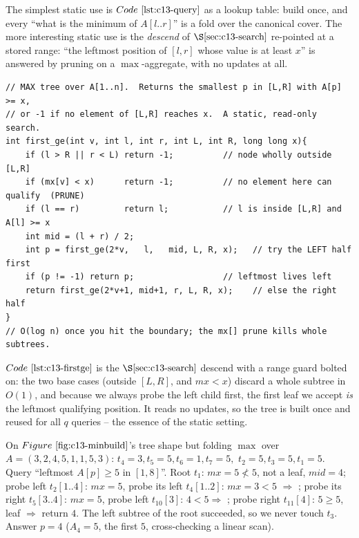 The simplest static use is \(\coderef{c13-query}\) as a lookup table: build once,
and every ``what is the minimum of \(A[l..r]\)'' is a fold over the canonical
cover.  The more interesting static use is the \emph{descend}
of \(\secref{c13-search}\) re-pointed at a stored range: ``the leftmost position
of \([l,r]\) whose value is at least \(x\)'' is answered by pruning on a
\(\max\)-aggregate, with no updates at all.

\begin{lstlisting}[caption={leftmost position in a closed range whose stored max clears a threshold -- a static descend}, label={lst:c13-firstge}]
// MAX tree over A[1..n].  Returns the smallest p in [L,R] with A[p] >= x,
// or -1 if no element of [L,R] reaches x.  A static, read-only search.
int first_ge(int v, int l, int r, int L, int R, long long x){
    if (l > R || r < L) return -1;          // node wholly outside [L,R]
    if (mx[v] < x)      return -1;          // no element here can qualify  (PRUNE)
    if (l == r)         return l;           // l is inside [L,R] and A[l] >= x
    int mid = (l + r) / 2;
    int p = first_ge(2*v,   l,   mid, L, R, x);   // try the LEFT half first
    if (p != -1) return p;                  // leftmost lives left
    return first_ge(2*v+1, mid+1, r, L, R, x);    // else the right half
}
// O(log n) once you hit the boundary; the mx[] prune kills whole subtrees.
\end{lstlisting}

\begin{observation}
\(\coderef{c13-firstge}\) is the \(\secref{c13-search}\) descend with a range
guard bolted on: the two  base cases (outside \([L,R]\), and
\(\mathit{mx}<x\)) discard a whole subtree in \(O(1)\), and because we always
probe the left child first, the first leaf we accept \emph{is} the leftmost
qualifying position.  It reads no updates, so the tree is built once and reused
for all \(q\) queries -- the essence of the static setting.
\end{observation}

\begin{tracebox}
On \(\figref{c13-minbuild}\)'s tree shape but folding \(\max\) over
\(A=(3,2,4,5,1,1,5,3)\): \(t_4{=}3,t_5{=}5,t_6{=}1,t_7{=}5,\)
\(t_2{=}5,t_3{=}5,t_1{=}5\).  Query ``leftmost \(A[p]\ge 5\) in \([1,8]\)''.
Root \(t_1\): \(\mathit{mx}{=}5\not<5\), not a leaf, \(\mathit{mid}{=}4\); probe
left \(t_2[1..4]\): \(\mathit{mx}{=}5\), probe its left \(t_4[1..2]\):
\(\mathit{mx}{=}3<5\) \(\Rightarrow\) ; probe its right \(t_5[3..4]\):
\(\mathit{mx}{=}5\), probe left \(t_{10}[3]\): \(4<5\Rightarrow\) ; probe
right \(t_{11}[4]\): \(5\ge5\), leaf \(\Rightarrow\) return \(4\).  The left
subtree of the root succeeded, so we never touch \(t_3\).  Answer \(p{=}4\)
(\(A_4{=}5\), the first \(5\), cross-checking a linear scan).
\end{tracebox}

